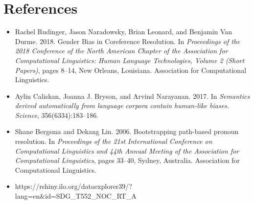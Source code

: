 \documentclass[12pt]{article}
\begin{document}
\section*{References} 
\begin{itemize}
    \item Rachel Rudinger, Jason Naradowsky, Brian Leonard, and Benjamin Van Durme. 2018. Gender Bias in Coreference Resolution. In \textit{Proceedings of the 2018 Conference of the North American Chapter of the Association for Computational Linguistics: Human Language Technologies, Volume 2 (Short Papers)}, pages 8–14, New Orleans, Louisiana. Association for Computational Linguistics.
    \item Aylin Caliskan, Joanna J. Bryson, and Arvind Narayanan. 2017. In \textit{Semantics derived automatically from language corpora contain human-like biases. Science}, 356(6334):183–186.
    \item Shane Bergsma and Dekang Lin. 2006. Bootstrapping
    path-based pronoun resolution. In \textit{Proceedings of the 21st International Conference on Computational Linguistics and 44th Annual Meeting of the Association for Computational Linguistics}, pages 33–40, Sydney, Australia. Association for Computational Linguistics.
    \item https://rshiny.ilo.org/dataexplorer39/?lang=en\&id=SDG\_T552\_NOC\_RT\_A
\end{itemize}
\end{document}
